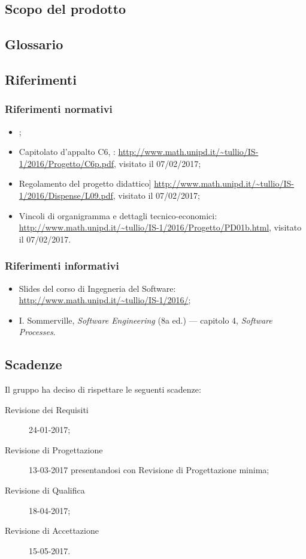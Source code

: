 \subsection{Scopo del prodotto}
\scopo

\subsection{Glossario}
\presgloss

\subsection{Riferimenti}
\subsubsection{Riferimenti normativi}
\begin{itemize}
	\item \NdP;
	\item Capitolato d'appalto C6, \proj: \url{http://www.math.unipd.it/~tullio/IS-1/2016/Progetto/C6p.pdf}, visitato il 07/02/2017;
	\item Regolamento del progetto didattico] \url{http://www.math.unipd.it/~tullio/IS-1/2016/Dispense/L09.pdf}, visitato il 07/02/2017;
	\item Vincoli di organigramma e dettagli tecnico-economici: \url{http://www.math.unipd.it/~tullio/IS-1/2016/Progetto/PD01b.html}, visitato il 07/02/2017.
\end{itemize}
\subsubsection{Riferimenti informativi} \label{sec:ref}
\begin{itemize}
	\item Slides del corso di Ingegneria del Software: \url{http://www.math.unipd.it/~tullio/IS-1/2016/};
	\item I. Sommerville, \emph{Software Engineering} (8a ed.) --- capitolo 4, \emph{Software Processes}.
\end{itemize}

\subsection{Scadenze}
Il gruppo \hx{} ha deciso di rispettare le seguenti scadenze:
\begin{description}
	\item[Revisione dei Requisiti] 24-01-2017;
	\item[Revisione di Progettazione] 13-03-2017 presentandosi con Revisione di Progettazione minima;
	\item[Revisione di Qualifica] 18-04-2017;
	\item[Revisione di Accettazione] 15-05-2017.
\end{description}





